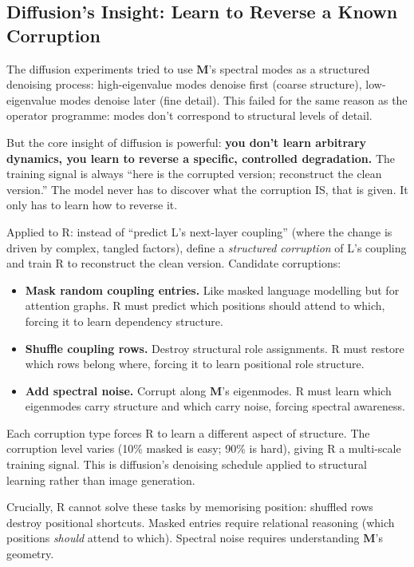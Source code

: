 \documentclass[11pt, a4paper]{article}
\newcommand{\M}{\mathbf{M}}
\theoremstyle{plain}
\theoremstyle{definition}
\theoremstyle{remark}
\begin{document}
\subsection{Diffusion's Insight: Learn to Reverse a Known Corruption}

The diffusion experiments tried to use $\M$'s spectral modes as a structured denoising process: high-eigenvalue modes denoise first (coarse structure), low-eigenvalue modes denoise later (fine detail).
This failed for the same reason as the operator programme: modes don't correspond to structural levels of detail.

But the core insight of diffusion is powerful: \textbf{you don't learn arbitrary dynamics, you learn to reverse a specific, controlled degradation.}
The training signal is always ``here is the corrupted version; reconstruct the clean version.''
The model never has to discover what the corruption IS, that is given.
It only has to learn how to reverse it.

Applied to R: instead of ``predict L's next-layer coupling'' (where the change is driven by complex, tangled factors), define a \emph{structured corruption} of L's coupling and train R to reconstruct the clean version.
Candidate corruptions:
\begin{itemize}[nosep]
\item \textbf{Mask random coupling entries.} Like masked language modelling but for attention graphs. R must predict which positions should attend to which, forcing it to learn dependency structure.
\item \textbf{Shuffle coupling rows.} Destroy structural role assignments. R must restore which rows belong where, forcing it to learn positional role structure.
\item \textbf{Add spectral noise.} Corrupt along $\M$'s eigenmodes. R must learn which eigenmodes carry structure and which carry noise, forcing spectral awareness.
\end{itemize}

Each corruption type forces R to learn a different aspect of structure.
The corruption level varies (10\% masked is easy; 90\% is hard), giving R a multi-scale training signal.
This is diffusion's denoising schedule applied to structural learning rather than image generation.

Crucially, R cannot solve these tasks by memorising position:
shuffled rows destroy positional shortcuts.
Masked entries require relational reasoning (which positions \emph{should} attend to which).
Spectral noise requires understanding $\M$'s geometry.
\end{document}
